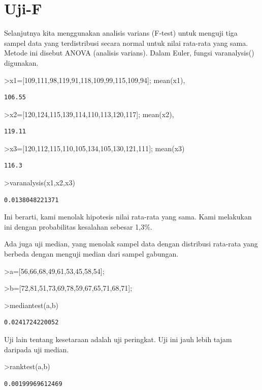 \documentclass[
]{book}
\begin{document}
\chapter{Uji-F}\label{uji-f}

Selanjutnya kita menggunakan analisis varians (F-test) untuk menguji tiga sampel data yang terdistribusi secara normal untuk nilai rata-rata yang sama. Metode ini disebut ANOVA (analisis varians). Dalam Euler, fungsi varanalysis() digunakan.

\textgreater x1={[}109,111,98,119,91,118,109,99,115,109,94{]}; mean(x1),

\begin{verbatim}
106.55
\end{verbatim}

\textgreater x2={[}120,124,115,139,114,110,113,120,117{]}; mean(x2),

\begin{verbatim}
119.11
\end{verbatim}

\textgreater x3={[}120,112,115,110,105,134,105,130,121,111{]}; mean(x3)

\begin{verbatim}
116.3
\end{verbatim}

\textgreater varanalysis(x1,x2,x3)

\begin{verbatim}
0.0138048221371
\end{verbatim}

Ini berarti, kami menolak hipotesis nilai rata-rata yang sama. Kami melakukan ini dengan probabilitas kesalahan sebesar 1,3\%.

Ada juga uji median, yang menolak sampel data dengan distribusi rata-rata yang berbeda dengan menguji median dari sampel gabungan.

\textgreater a={[}56,66,68,49,61,53,45,58,54{]};

\textgreater b={[}72,81,51,73,69,78,59,67,65,71,68,71{]};

\textgreater mediantest(a,b)

\begin{verbatim}
0.0241724220052
\end{verbatim}

Uji lain tentang kesetaraan adalah uji peringkat. Uji ini jauh lebih tajam daripada uji median.

\textgreater ranktest(a,b)

\begin{verbatim}
0.00199969612469
\end{verbatim}
\end{document}

